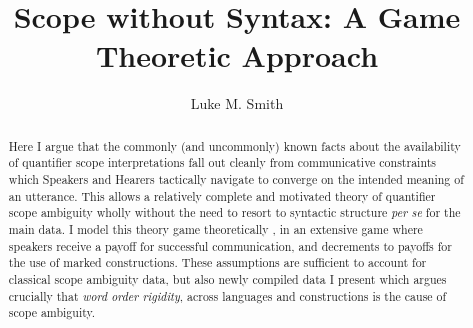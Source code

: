 \documentclass{article}
\title{Scope without Syntax: A Game Theoretic Approach}
\author{Luke M. Smith}
\begin{document}
\maketitle

\begin{abstract}
	Here I argue that the commonly (and uncommonly) known facts about the availability of quantifier scope interpretations fall out cleanly from communicative constraints which Speakers and Hearers tactically navigate to converge on the intended meaning of an utterance.
	This allows a relatively complete and motivated theory of quantifier scope ambiguity wholly without the need to resort to syntactic structure \textit{per se} for the main data.
	I model this theory game theoretically \parencite{neumann44}, in an extensive game \parencite{hart92} where speakers receive a payoff for successful communication, and decrements to payoffs for the use of marked constructions.
	These assumptions are sufficient to account for classical scope ambiguity data, but also newly compiled data I present which argues crucially that \emph{word order rigidity}, across languages and constructions is the cause of scope ambiguity.
\end{abstract}




\tableofcontents

\listoffigures

\end{document}
